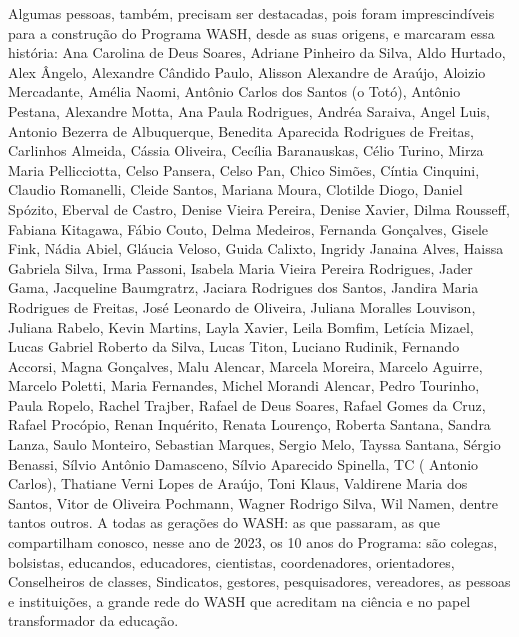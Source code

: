 \begin{agradecimentos}
Algumas pessoas, também, precisam ser destacadas, pois foram imprescindíveis para a construção do Programa WASH, desde as suas origens, e marcaram essa história: Ana Carolina de Deus Soares, Adriane Pinheiro da Silva, Aldo Hurtado, Alex Ângelo, Alexandre Cândido Paulo, Alisson Alexandre de Araújo, Aloizio Mercadante, Amélia Naomi, Antônio Carlos dos Santos (o Totó), Antônio Pestana, Alexandre Motta, Ana Paula Rodrigues, Andréa Saraiva, Angel Luis, Antonio Bezerra de Albuquerque, Benedita Aparecida Rodrigues de Freitas, Carlinhos Almeida, Cássia Oliveira, Cecília Baranauskas, Célio Turino, Mirza Maria Pellicciotta, Celso Pansera, Celso Pan, Chico Simões, Cíntia Cinquini, Claudio Romanelli, Cleide Santos, Mariana Moura, Clotilde Diogo, Daniel Spózito, Eberval de Castro, Denise  Vieira Pereira, Denise Xavier, Dilma Rousseff,  Fabiana Kitagawa, Fábio Couto, Delma  Medeiros, Fernanda Gonçalves, Gisele Fink, Nádia Abiel, Gláucia Veloso, Guida Calixto,  Ingridy Janaina Alves, Haissa Gabriela Silva, Irma Passoni, Isabela Maria Vieira Pereira Rodrigues, Jader Gama, Jacqueline Baumgratrz, Jaciara Rodrigues dos Santos, Jandira Maria Rodrigues de Freitas, José Leonardo de Oliveira, Juliana Moralles Louvison, Juliana Rabelo, Kevin Martins, Layla Xavier, Leila Bomfim, Letícia Mizael, Lucas Gabriel Roberto da Silva, Lucas Titon, Luciano Rudinik, Fernando Accorsi, Magna Gonçalves, Malu Alencar, Marcela Moreira, Marcelo Aguirre, Marcelo Poletti, Maria Fernandes, Michel Morandi Alencar, Pedro Tourinho, Paula Ropelo, Rachel Trajber, Rafael de Deus Soares, Rafael Gomes da Cruz, Rafael Procópio, Renan Inquérito, Renata Lourenço, Roberta Santana,  Sandra Lanza, Saulo Monteiro, Sebastian Marques, Sergio Melo, Tayssa Santana,  Sérgio Benassi, Sílvio Antônio Damasceno, Sílvio Aparecido Spinella, TC ( Antonio Carlos), Thatiane Verni Lopes de Araújo, Toni Klaus, Valdirene Maria dos Santos, Vitor de Oliveira Pochmann, Wagner Rodrigo Silva, Wil Namen, dentre tantos outros.
A todas as gerações do WASH: as que passaram, as que compartilham conosco, nesse ano de 2023, os 10 anos do Programa: são colegas, bolsistas, educandos, educadores, cientistas, coordenadores, orientadores, Conselheiros de classes, Sindicatos, gestores, pesquisadores, vereadores, as pessoas e instituições, a grande rede do WASH que acreditam na ciência e no papel transformador da educação.

\end{agradecimentos}
